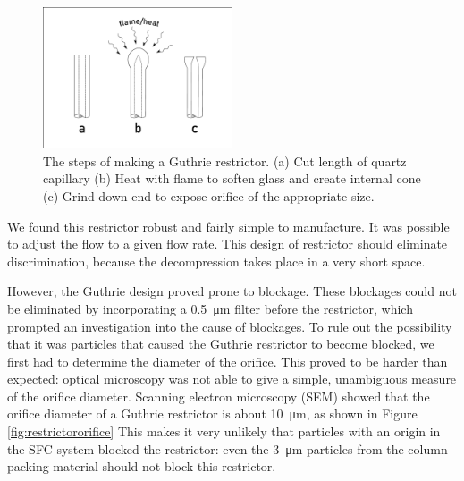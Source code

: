 \begin{figure}
\centering
\includegraphics[width=0.5\textwidth]{Figures/Restrictor.pdf}
\decoRule

\caption[A diagram of a integral restrictor.]{The steps of making a Guthrie restrictor. (a) Cut
length of quartz capillary (b) Heat with flame to soften glass and create
internal cone (c) Grind down end to expose orifice of the appropriate size.}

\label{fig:restrictor}
\end{figure}

We found this restrictor robust and fairly simple to manufacture. It was
possible to adjust the flow to a given flow rate. This design of restrictor
should eliminate discrimination, because the decompression takes place in a very
short space.

However, the Guthrie design proved prone to blockage. These blockages could not
be eliminated by incorporating a \SI{0.5}{\micro\metre} filter before the
restrictor, which prompted an investigation into the cause of blockages. To rule
out the possibility that it was particles that caused the Guthrie restrictor to
become blocked, we first had to determine the diameter of the orifice. This
proved to be harder than expected: optical microscopy was not able to give a
simple, unambiguous measure of the orifice diameter. Scanning electron
microscopy (SEM) showed that the orifice diameter of a Guthrie restrictor is
about \SI{10}{\micro\meter}, as shown in Figure \ref{fig:restrictororifice} This
makes it very unlikely that particles with an origin in the SFC system blocked
the restrictor: even the \SI{3}{\micro\meter} particles from the column packing
material should not block this restrictor.

